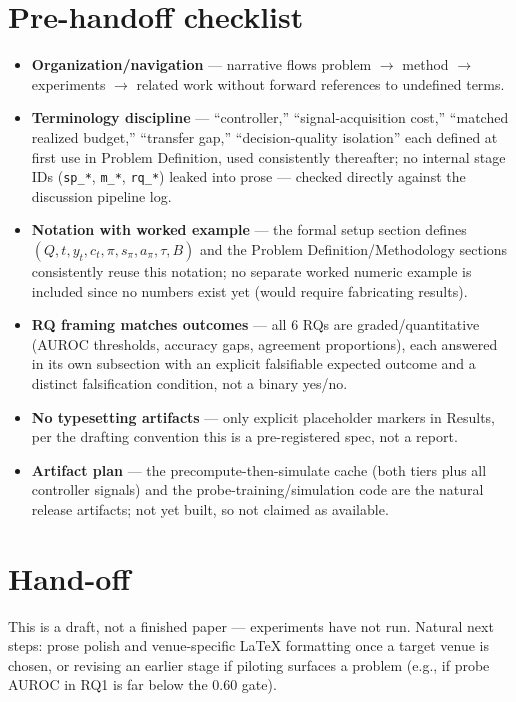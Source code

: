 \documentclass[11pt]{article}
\begin{document}
\section*{Pre-handoff checklist}
\begin{itemize}[leftmargin=1.4em]
\item \textbf{Organization/navigation} --- narrative flows problem $\to$ method $\to$ experiments $\to$ related work without forward references to undefined terms.
\item \textbf{Terminology discipline} --- ``controller,'' ``signal-acquisition cost,'' ``matched realized budget,'' ``transfer gap,'' ``decision-quality isolation'' each defined at first use in Problem Definition, used consistently thereafter; no internal stage IDs (\texttt{sp\_*}, \texttt{m\_*}, \texttt{rq\_*}) leaked into prose --- checked directly against the discussion pipeline log.
\item \textbf{Notation with worked example} --- the formal setup section defines $(Q, t, y_t, c_t, \pi, s_\pi, a_\pi, \tau, B)$ and the Problem Definition/Methodology sections consistently reuse this notation; no separate worked numeric example is included since no numbers exist yet (would require fabricating results).
\item \textbf{RQ framing matches outcomes} --- all 6 RQs are graded/quantitative (AUROC thresholds, accuracy gaps, agreement proportions), each answered in its own subsection with an explicit falsifiable expected outcome and a distinct falsification condition, not a binary yes/no.
\item \textbf{No typesetting artifacts} --- only explicit placeholder markers in Results, per the drafting convention this is a pre-registered spec, not a report.
\item \textbf{Artifact plan} --- the precompute-then-simulate cache (both tiers plus all controller signals) and the probe-training/simulation code are the natural release artifacts; not yet built, so not claimed as available.
\end{itemize}

\section*{Hand-off}
This is a draft, not a finished paper --- experiments have not run. Natural next steps: prose polish and venue-specific LaTeX formatting once a target venue is chosen, or revising an earlier stage if piloting surfaces a problem (e.g., if probe AUROC in RQ1 is far below the 0.60 gate).



\end{document}
